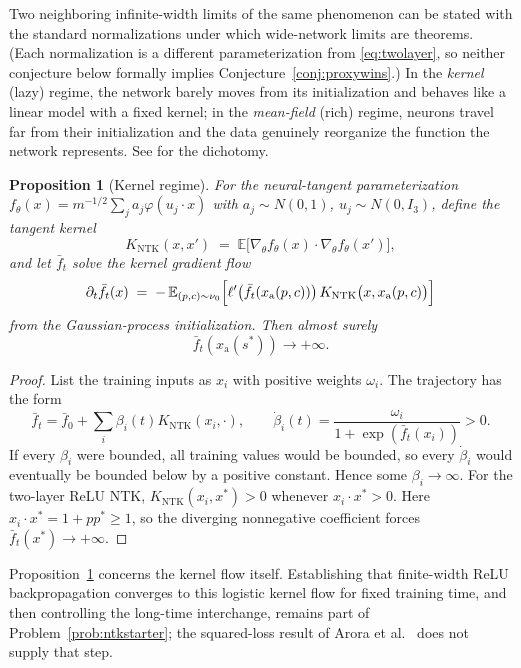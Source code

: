 \documentclass[11pt]{amsart}
\theoremstyle{plain}
\newtheorem{proposition}[theorem]{Proposition}
\theoremstyle{definition}
\begin{document}
Two neighboring infinite-width limits of the same phenomenon can be stated with the standard normalizations under which wide-network limits are theorems. (Each normalization is a different parameterization from \eqref{eq:twolayer}, so neither conjecture below formally implies Conjecture~\ref{conj:proxywins}.) In the \emph{kernel} (lazy) regime, the network barely moves from its initialization and behaves like a linear model with a fixed kernel; in the \emph{mean-field} (rich) regime, neurons travel far from their initialization and the data genuinely reorganize the function the network represents. See \cite{chizat2019} for the dichotomy.

\begin{proposition}[Kernel regime]\label{prop:ntk}
For the neural-tangent parameterization $f_\theta(x)=m^{-1/2}\sum_j a_j\varphi(u_j\cdot x)$ with $a_j\sim N(0,1)$, $u_j\sim N(0,I_3)$, define the \emph{tangent kernel}
\[
   K_{\mathrm{NTK}}(x,x')\;=\;\mathbb E\bigl[\nabla_\theta f_\theta(x)\cdot\nabla_\theta f_\theta(x')\bigr],
\]
and let $\bar f_t$ solve the kernel gradient flow
\[
   \partial_t\bar f_t(x)\;=\;-\,\mathbb E_{(p,c)\sim\nu_0}\Bigl[\ell'\bigl(\bar f_t(x_{\mathrm a}(p,c))\bigr)\,K_{\mathrm{NTK}}\bigl(x,x_{\mathrm a}(p,c)\bigr)\Bigr]
\]
from the Gaussian-process initialization. Then almost surely
\[
\bar f_t(x_{\mathrm a}(s^*))\longrightarrow+\infty.
\]
\end{proposition}

\begin{proof}
List the training inputs as $x_i$ with positive weights $\omega_i$. The trajectory has the form
\[
\bar f_t=\bar f_0+\sum_i\beta_i(t)K_{\mathrm{NTK}}(x_i,\cdot),
\qquad
\dot\beta_i(t)=\frac{\omega_i}{1+\exp(\bar f_t(x_i))}>0.
\]
If every $\beta_i$ were bounded, all training values would be bounded, so every $\dot\beta_i$ would eventually be bounded below by a positive constant. Hence some $\beta_i\to\infty$. For the two-layer ReLU NTK, $K_{\mathrm{NTK}}(x_i,x^*)>0$ whenever $x_i\cdot x^*>0$. Here $x_i\cdot x^*=1+pp^*\ge1$, so the diverging nonnegative coefficient forces $\bar f_t(x^*)\to+\infty$.
\end{proof}

Proposition~\ref{prop:ntk} concerns the kernel flow itself. Establishing that finite-width ReLU backpropagation converges to this logistic kernel flow for fixed training time, and then controlling the long-time interchange, remains part of Problem~\ref{prob:ntkstarter}; the squared-loss result of Arora et al.~\cite{arora2019} does not supply that step.
\end{document}
